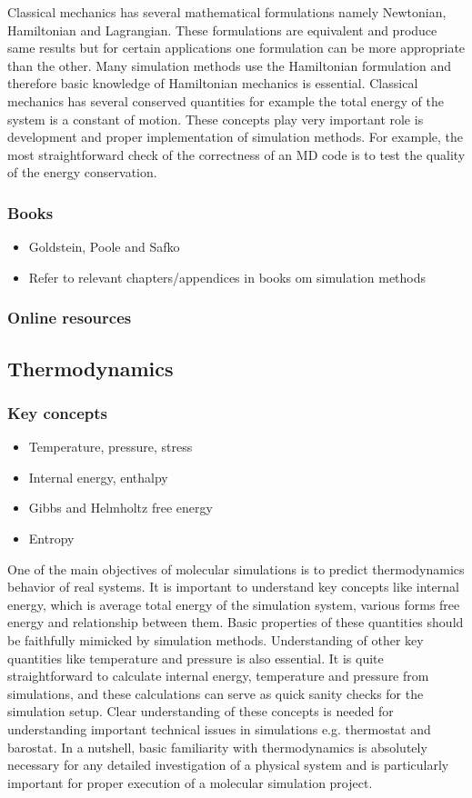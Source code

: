 \documentclass[9pt,bestpractices]{livecoms}
\begin{document}
Classical mechanics has several mathematical formulations namely Newtonian, Hamiltonian and Lagrangian. These formulations are equivalent and produce same results but for certain applications one formulation can be more appropriate than the other. Many simulation methods use the Hamiltonian formulation and therefore basic knowledge of Hamiltonian mechanics is essential. Classical mechanics has several conserved quantities for example the total energy of the system is a constant of motion. These concepts play very important role is development and proper implementation of simulation methods. For example, the most straightforward check of the correctness of an MD code is to test the quality of the energy conservation.

\subsubsection{Books}
\begin{itemize}
\item Goldstein, Poole and Safko
\item Refer to relevant chapters/appendices in books om simulation methods
\end{itemize}

\subsubsection{Online resources}


\subsection{Thermodynamics}
\subsubsection{Key concepts}
\begin{itemize}
\item Temperature, pressure, stress
\item Internal energy, enthalpy
\item Gibbs and Helmholtz free energy
\item Entropy
\end{itemize}

One of the main objectives of molecular simulations is to predict thermodynamics behavior of real systems. It is important to understand key concepts like internal energy, which is average total energy of the simulation system, various forms free energy and relationship between them. Basic properties of these quantities should be faithfully mimicked by simulation methods. Understanding of other key quantities like temperature and pressure is also essential. It is quite straightforward to calculate internal energy, temperature and pressure from simulations, and these calculations can serve as quick sanity checks for the simulation setup. Clear understanding of these concepts is needed for understanding important technical issues in simulations e.g. thermostat and barostat.
In a nutshell, basic familiarity with thermodynamics is absolutely necessary for any detailed investigation of a physical system and is particularly important for proper execution of a molecular simulation project.
\end{document}
